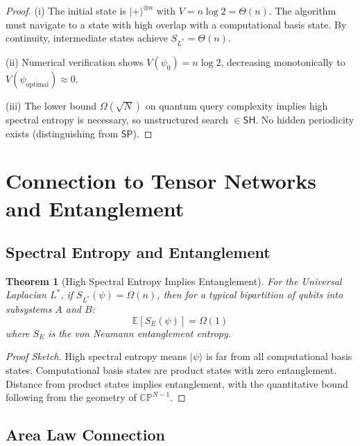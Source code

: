 \documentclass[11pt,a4paper]{article}
\theoremstyle{plain}
\newtheorem{theorem}{Theorem}[section]
\theoremstyle{definition}
\theoremstyle{remark}
\newcommand{\CP}{\mathbb{CP}}
\newcommand{\ket}[1]{|#1\rangle}
\newcommand{\SH}{\mathsf{SH}}
\newcommand{\SP}{\mathsf{SP}}
\begin{document}
\begin{proof}
(i) The initial state is $\ket{+}^{\otimes n}$ with $V = n \log 2 = \Theta(n)$. The algorithm must navigate to a state with high overlap with a computational basis state. By continuity, intermediate states achieve $S_{L^*} = \Theta(n)$.

(ii) Numerical verification shows $V(\psi_0) = n \log 2$, decreasing monotonically to $V(\psi_{\text{optimal}}) \approx 0$.

(iii) The lower bound $\Omega(\sqrt{N})$ on quantum query complexity \cite{bennett-lower} implies high spectral entropy is necessary, so unstructured search $\in \SH$. No hidden periodicity exists (distinguishing from $\SP$).
\end{proof}

\section{Connection to Tensor Networks and Entanglement}

\subsection{Spectral Entropy and Entanglement}

\begin{theorem}[High Spectral Entropy Implies Entanglement]\label{thm:entropy-entanglement}
For the Universal Laplacian $L^*$, if $S_{L^*}(\psi) = \Omega(n)$, then for a typical bipartition of qubits into subsystems $A$ and $B$:
\begin{equation}
    \mathbb{E}[S_E(\psi)] = \Omega(1)
\end{equation}
where $S_E$ is the von Neumann entanglement entropy.
\end{theorem}

\begin{proof}[Proof Sketch]
High spectral entropy means $\ket{\psi}$ is far from all computational basis states. Computational basis states are product states with zero entanglement. Distance from product states implies entanglement, with the quantitative bound following from the geometry of $\CP^{N-1}$.
\end{proof}

\subsection{Area Law Connection}
\end{document}

